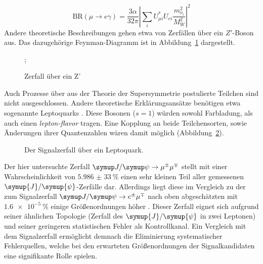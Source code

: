 %
\begin{equation}\label{eq:BRmuega}
  \text{BR}(\mu\rightarrow e\gamma)=\frac{3\alpha}{32\pi}\left|\sum_i U_{\mu i}^*U_{ei}\frac{m^2_{\nu_i}}{M^2_W}\right|^2
\end{equation}
%
Andere theoretische Beschreibungen gehen etwa von Zerfällen über ein $Z'$-Boson aus\cite{zprime}. Das dazugehörige Feynman-Diagramm ist in Abbildung~\ref{fig:Zprime} dargestellt.
%
\begin{figure}
  \centering
  ;
\caption{Zerfall über ein Z'}
\label{fig:Zprime}
\end{figure}
%
Auch Prozesse über aus der Theorie der Supersymmetrie postulierte Teilchen sind nicht ausgeschlossen\cite{susy_gut1}\cite{susy_gut2}. Andere theoretische Erklärungsansätze benötigen etwa sogenannte Leptoquarks \cite{leptoq}. Diese Bosonen ($s=1$) würden sowohl Farbladung, als auch einen \textit{lepton-flavor} tragen. Eine Kopplung an beide Teilchensorten, sowie Änderungen ihrer Quantenzahlen wären damit möglich (Abbildung~\ref{fig:lepto}).
%
\begin{figure}[H]
  \centering
    \caption{Der Signalzerfall über ein Leptoquark.}
    \label{fig:lepto}
  \end{figure}
%
Der hier untersuchte Zerfall $\kontroll$ stellt mit einer Wahrscheinlichkeit von $\SI{5,986(33)}{\percent}$ einen sehr kleinen Teil aller gemessenen $\symup{J}/\symup{\psi}$-Zerfälle dar\cite{pdg}. Allerdings liegt diese im Vergleich zu der zum Signalzerfall $\signal$ nach oben abgeschätzten mit $\SI{1,6e-5}{\percent}$ einige Größenordnungen höher \cite{pdg}. Dieser Zerfall eignet sich aufgrund seiner ähnlichen Topologie (Zerfall des $\symup{J}/\symup{\psi}$ in zwei Leptonen) und seiner geringeren statistischen Fehler als Kontrollkanal. Ein Vergleich mit dem Signalzerfall ermöglicht demnach die Eliminierung systematischer Fehlerquellen, welche bei den erwarteten Größenordnungen der Signalkandidaten eine signifikante Rolle spielen.
